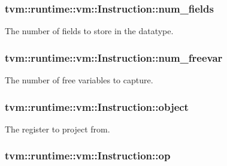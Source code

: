\subsubsection[{\texorpdfstring{num\+\_\+fields}{num_fields}}]{ tvm\+::runtime\+::vm\+::\+Instruction\+::num\+\_\+fields}\hypertarget{structtvm_1_1runtime_1_1vm_1_1Instruction_a45fa340afb68a10e339b9482fda65ba7}{}\label{structtvm_1_1runtime_1_1vm_1_1Instruction_a45fa340afb68a10e339b9482fda65ba7}


The number of fields to store in the datatype. 

\subsubsection[{\texorpdfstring{num\+\_\+freevar}{num_freevar}}]{ tvm\+::runtime\+::vm\+::\+Instruction\+::num\+\_\+freevar}\hypertarget{structtvm_1_1runtime_1_1vm_1_1Instruction_adbf563aa259f209ad20619c25921cdc1}{}\label{structtvm_1_1runtime_1_1vm_1_1Instruction_adbf563aa259f209ad20619c25921cdc1}


The number of free variables to capture. 

\subsubsection[{\texorpdfstring{object}{object}}]{ tvm\+::runtime\+::vm\+::\+Instruction\+::object}\hypertarget{structtvm_1_1runtime_1_1vm_1_1Instruction_a0ac4dada6519d071a819cc897cb15cf1}{}\label{structtvm_1_1runtime_1_1vm_1_1Instruction_a0ac4dada6519d071a819cc897cb15cf1}


The register to project from. 

\subsubsection[{\texorpdfstring{op}{op}}]{ tvm\+::runtime\+::vm\+::\+Instruction\+::op}\hypertarget{structtvm_1_1runtime_1_1vm_1_1Instruction_aa16a3e7e4030a69da0def6465d65e745}{}\label{structtvm_1_1runtime_1_1vm_1_1Instruction_aa16a3e7e4030a69da0def6465d65e745}


